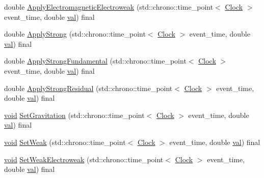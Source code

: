 \begin{DoxyCompactItemize}
\item 
double \mbox{\hyperlink{class_cognitive_network_a9753f52c9e36ad44e9fac1d3e38a0770}{Apply\+Electromagnetic\+Electroweak}} (std\+::chrono\+::time\+\_\+point$<$ \mbox{\hyperlink{universe_8h_a0ef8d951d1ca5ab3cfaf7ab4c7a6fd80}{Clock}} $>$ event\+\_\+time, double \mbox{\hyperlink{glad_8h_a26942fd2ed566ef553eae82d2c109c8f}{val}}) final
\item 
double \mbox{\hyperlink{class_cognitive_network_a7a55750d3c42a277c4ffe04a87ab3b19}{Apply\+Strong}} (std\+::chrono\+::time\+\_\+point$<$ \mbox{\hyperlink{universe_8h_a0ef8d951d1ca5ab3cfaf7ab4c7a6fd80}{Clock}} $>$ event\+\_\+time, double \mbox{\hyperlink{glad_8h_a26942fd2ed566ef553eae82d2c109c8f}{val}}) final
\item 
double \mbox{\hyperlink{class_cognitive_network_af25bbd4f4d8f370cd2a48fd6db8302b9}{Apply\+Strong\+Fundamental}} (std\+::chrono\+::time\+\_\+point$<$ \mbox{\hyperlink{universe_8h_a0ef8d951d1ca5ab3cfaf7ab4c7a6fd80}{Clock}} $>$ event\+\_\+time, double \mbox{\hyperlink{glad_8h_a26942fd2ed566ef553eae82d2c109c8f}{val}}) final
\item 
double \mbox{\hyperlink{class_cognitive_network_a8b60fdb81d89a3a74d6c06cb29e7aad3}{Apply\+Strong\+Residual}} (std\+::chrono\+::time\+\_\+point$<$ \mbox{\hyperlink{universe_8h_a0ef8d951d1ca5ab3cfaf7ab4c7a6fd80}{Clock}} $>$ event\+\_\+time, double \mbox{\hyperlink{glad_8h_a26942fd2ed566ef553eae82d2c109c8f}{val}}) final
\item 
\mbox{\hyperlink{glad_8h_a950fc91edb4504f62f1c577bf4727c29}{void}} \mbox{\hyperlink{class_cognitive_network_af9f082a70f0cc25a3f818d9eace5a527}{Set\+Gravitation}} (std\+::chrono\+::time\+\_\+point$<$ \mbox{\hyperlink{universe_8h_a0ef8d951d1ca5ab3cfaf7ab4c7a6fd80}{Clock}} $>$ event\+\_\+time, double \mbox{\hyperlink{glad_8h_a26942fd2ed566ef553eae82d2c109c8f}{val}}) final
\item 
\mbox{\hyperlink{glad_8h_a950fc91edb4504f62f1c577bf4727c29}{void}} \mbox{\hyperlink{class_cognitive_network_ab39c9eed50da6d3630c4498ae64b804e}{Set\+Weak}} (std\+::chrono\+::time\+\_\+point$<$ \mbox{\hyperlink{universe_8h_a0ef8d951d1ca5ab3cfaf7ab4c7a6fd80}{Clock}} $>$ event\+\_\+time, double \mbox{\hyperlink{glad_8h_a26942fd2ed566ef553eae82d2c109c8f}{val}}) final
\item 
\mbox{\hyperlink{glad_8h_a950fc91edb4504f62f1c577bf4727c29}{void}} \mbox{\hyperlink{class_cognitive_network_a116f6818986a622e4a318857859e2495}{Set\+Weak\+Electroweak}} (std\+::chrono\+::time\+\_\+point$<$ \mbox{\hyperlink{universe_8h_a0ef8d951d1ca5ab3cfaf7ab4c7a6fd80}{Clock}} $>$ event\+\_\+time, double \mbox{\hyperlink{glad_8h_a26942fd2ed566ef553eae82d2c109c8f}{val}}) final

\end{DoxyCompactItemize}
